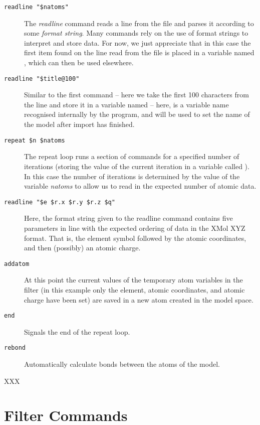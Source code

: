 \begin{description}
	\item[\texttt{readline "\$natoms"}\its]
		The {\it readline} command reads a line from the file and parses it according to some {\it format string}. Many commands rely on the use of format strings to interpret and store data. For now, we just appreciate that in this case the first item found on the line read from the file is placed in a variable named , which can then be used elsewhere.
	\item[\texttt{readline "\$title@100"}\its]
		Similar to the first command -- here we take the first 100 characters from the line and store it in a variable named  -- here,  is a variable name recognised internally by the program, and will be used to set the name of the model after import has finished.
	\item[\texttt{repeat \$n \$natoms}\its]
		The repeat loop runs a section of commands for a specified number of iterations (storing the value of the current iteration in a variable called ). In this case the number of iterations is determined by the value of the variable {\it natoms} to allow us to read in the expected number of atomic data.
	\item[\texttt{readline "\$e \$r.x \$r.y \$r.z \$q"}\its]
		Here, the format string given to the readline command contains five parameters in line with the expected ordering of data in the XMol XYZ format. That is, the element symbol followed by the atomic coordinates, and then (possibly) an atomic charge.
	\item[\texttt{addatom}\its]
		At this point the current values of the temporary atom variables in the filter (in this example only the element, atomic coordinates, and atomic charge have been set) are saved in a new atom created in the model space.
	\item[\texttt{end}\its]
		Signals the end of the repeat loop.
	\item[\texttt{rebond}\its]
		Automatically calculate bonds between the atoms of the model.
\end{description}

XXX

\section{Filter Commands}
\label{sec:filtercmds}

